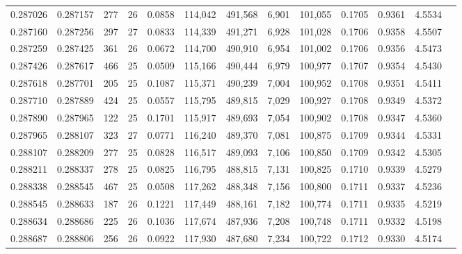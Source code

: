 \begin{tabular}{rrrrrrrrrrrrr}
0.287026 & 0.287157 &   277 &  26 &                                     0.0858 & 114,042 & 491,568 &   6,901 & 101,055 & 0.1705 & 0.9361 & 4.5534 \\
0.287160 & 0.287256 &   297 &  27 &                                     0.0833 & 114,339 & 491,271 &   6,928 & 101,028 & 0.1706 & 0.9358 & 4.5507 \\
0.287259 & 0.287425 &   361 &  26 &                                     0.0672 & 114,700 & 490,910 &   6,954 & 101,002 & 0.1706 & 0.9356 & 4.5473 \\
0.287426 & 0.287617 &   466 &  25 &                                     0.0509 & 115,166 & 490,444 &   6,979 & 100,977 & 0.1707 & 0.9354 & 4.5430 \\
0.287618 & 0.287701 &   205 &  25 &                                     0.1087 & 115,371 & 490,239 &   7,004 & 100,952 & 0.1708 & 0.9351 & 4.5411 \\
0.287710 & 0.287889 &   424 &  25 &                                     0.0557 & 115,795 & 489,815 &   7,029 & 100,927 & 0.1708 & 0.9349 & 4.5372 \\
0.287890 & 0.287965 &   122 &  25 &                                     0.1701 & 115,917 & 489,693 &   7,054 & 100,902 & 0.1708 & 0.9347 & 4.5360 \\
0.287965 & 0.288107 &   323 &  27 &                                     0.0771 & 116,240 & 489,370 &   7,081 & 100,875 & 0.1709 & 0.9344 & 4.5331 \\
0.288107 & 0.288209 &   277 &  25 &                                     0.0828 & 116,517 & 489,093 &   7,106 & 100,850 & 0.1709 & 0.9342 & 4.5305 \\
0.288211 & 0.288337 &   278 &  25 &                                     0.0825 & 116,795 & 488,815 &   7,131 & 100,825 & 0.1710 & 0.9339 & 4.5279 \\
0.288338 & 0.288545 &   467 &  25 &                                     0.0508 & 117,262 & 488,348 &   7,156 & 100,800 & 0.1711 & 0.9337 & 4.5236 \\
0.288545 & 0.288633 &   187 &  26 &                                     0.1221 & 117,449 & 488,161 &   7,182 & 100,774 & 0.1711 & 0.9335 & 4.5219 \\
0.288634 & 0.288686 &   225 &  26 &                                     0.1036 & 117,674 & 487,936 &   7,208 & 100,748 & 0.1711 & 0.9332 & 4.5198 \\
0.288687 & 0.288806 &   256 &  26 &                                     0.0922 & 117,930 & 487,680 &   7,234 & 100,722 & 0.1712 & 0.9330 & 4.5174 \\

\end{tabular}
